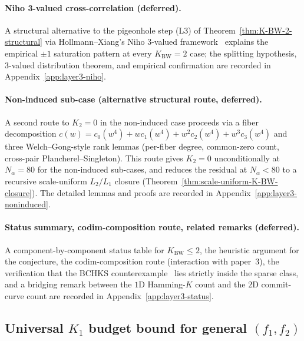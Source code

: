 \documentclass[11pt]{article}
\theoremstyle{definition}
\theoremstyle{remark}
\begin{document}
\paragraph{Niho 3-valued cross-correlation (deferred).}
A structural alternative to the pigeonhole step (L3) of
Theorem~\ref{thm:K-BW-2-structural} via Hollmann--Xiang's Niho
3-valued framework~\cite{HollmannXiang2001} explains the empirical
$\pm 1$ saturation pattern at every $K_{\mathrm{BW}}=2$ case;
the splitting hypothesis, $3$-valued distribution theorem, and
empirical confirmation are recorded in
Appendix~\ref{app:layer3-niho}.


\paragraph{Non-induced sub-case (alternative structural route, deferred).}
A second route to $K_2 = 0$ in the non-induced case proceeds via a
fiber decomposition $c(w) = c_0(w^4) + w c_1(w^4) + w^2 c_2(w^4) +
w^3 c_3(w^4)$ and three Welch--Gong-style rank lemmas (per-fiber
degree, common-zero count, cross-pair Plancherel--Singleton).
This route gives $K_2 = 0$ unconditionally at $N_\alpha = 80$ for
the non-induced sub-cases, and reduces the residual at $N_\alpha < 80$
to a recursive scale-uniform $L_2/L_1$ closure
(Theorem~\ref{thm:scale-uniform-K-BW-closure}). The detailed lemmas
and proofs are recorded in Appendix~\ref{app:layer3-noninduced}.


\paragraph{Status summary, codim-composition route, related remarks (deferred).}
A component-by-component status table for $K_{\mathrm{BW}} \leq 2$,
the heuristic argument for the conjecture, the codim-composition
route (interaction with paper~3), the verification that the
BCHKS counterexample~\cite{BCHKS} lies strictly inside the sparse
class, and a bridging remark between the $1$D Hamming-$K$ count and
the $2$D commit-curve count are recorded in
Appendix~\ref{app:layer3-status}.


\subsection{Universal $K_1$ budget bound for general $(f_1, f_2)$}
\label{ssec:K1-universal-budget}
\end{document}

